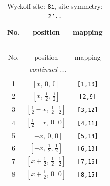 \documentclass[fleqn,8pt]{jsarticle}
\begin{document}
\begin{longtable}{ccc}
\caption{Wyckoff site: {\tt 8i}, site symmetry: {\tt 2'..}}
 \\
 \hline \hline
No. & position & mapping \\ \hline \endfirsthead

\multicolumn{2}{l}{\tablename\ \thetable{}} \\
 \hline \hline
No. & position & mapping \\ \hline \endhead

 \hline \hline
\multicolumn{2}{r}{\footnotesize\it continued ...} \\ \endfoot

 \hline \hline
\multicolumn{2}{r}{} \\ \endlastfoot

1 & $\left[ x,\, 0,\, 0 \right]$ & {\tt [1,10]} \\ \hline
2 & $\left[ x,\, \frac{1}{2},\, \frac{1}{2} \right]$ & {\tt [2,9]} \\ \hline
3 & $\left[ \frac{1}{2} - x,\, \frac{1}{2},\, \frac{1}{2} \right]$ & {\tt [3,12]} \\ \hline
4 & $\left[ \frac{1}{2} - x,\, 0,\, 0 \right]$ & {\tt [4,11]} \\ \hline
5 & $\left[ - x,\, 0,\, 0 \right]$ & {\tt [5,14]} \\ \hline
6 & $\left[ - x,\, \frac{1}{2},\, \frac{1}{2} \right]$ & {\tt [6,13]} \\ \hline
7 & $\left[ x + \frac{1}{2},\, \frac{1}{2},\, \frac{1}{2} \right]$ & {\tt [7,16]} \\ \hline
8 & $\left[ x + \frac{1}{2},\, 0,\, 0 \right]$ & {\tt [8,15]} \\
\end{longtable}
\renewcommand{\arraystretch}{1.2}
\end{document}

